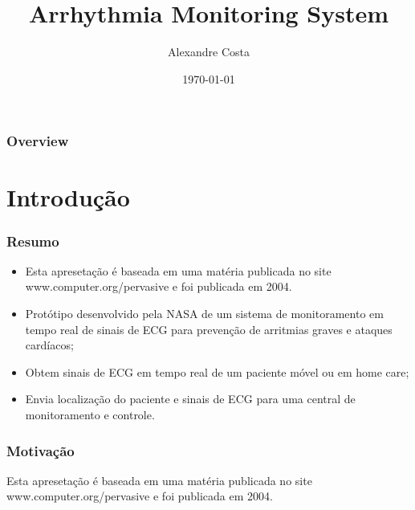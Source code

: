 \documentclass{beamer}
\title[AMS]{Arrhythmia Monitoring System} %
\author{Alexandre Costa} %
\institute[UFPEL] %
{
Universidade Federal de Pelotas \\ %
\medskip
\textit{alexandre.gcosta@gmail.com} %
}
\date{\today} %
\begin{document}
\begin{frame}
\titlepage %
\end{frame}

\begin{frame}
\frametitle{Overview} %
\tableofcontents %
\end{frame}


\section{Introdução}

\begin{frame}
	\frametitle{Resumo}
	\begin{itemize}
		\item Esta apresetação é baseada em uma matéria publicada no site www.computer.org/pervasive e foi publicada em 2004.
		\item Protótipo desenvolvido pela NASA de um sistema de monitoramento em tempo real de sinais de ECG para prevenção de arritmias graves e ataques cardíacos;
		\item Obtem sinais de ECG em tempo real de um paciente móvel ou em home care;
		\item Envia localização do paciente e sinais de ECG para uma central de monitoramento e controle.
	\end{itemize}
\end{frame}


\begin{frame}
	\frametitle{Motivação}
	Esta apresetação é baseada em uma matéria publicada no site www.computer.org/pervasive e foi publicada em 2004.
\end{frame}
\end{document}
